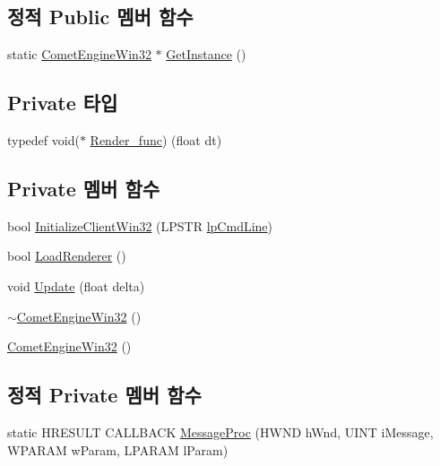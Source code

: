 \subsection*{정적 Public 멤버 함수}
\begin{DoxyCompactItemize}
\item 
static \hyperlink{class_comet_engine_1_1_comet_engine_win32}{Comet\+Engine\+Win32} $\ast$ \hyperlink{class_comet_engine_1_1_comet_engine_win32_af96d04b2fa84467a5342e290690e40fb}{Get\+Instance} ()
\end{DoxyCompactItemize}
\subsection*{Private 타입}
\begin{DoxyCompactItemize}
\item 
typedef void($\ast$ \hyperlink{class_comet_engine_1_1_comet_engine_win32_a97e4f6f1bfb397686ef973fe8bd42abf}{Render\+\_\+func}) (float dt)
\end{DoxyCompactItemize}
\subsection*{Private 멤버 함수}
\begin{DoxyCompactItemize}
\item 
bool \hyperlink{class_comet_engine_1_1_comet_engine_win32_a9f5ac1f01164dfdb7f752e6b4f77e80a}{Initialize\+Client\+Win32} (L\+P\+S\+TR \hyperlink{_d_l_l_comet_engine_win32_8cpp_af1ff5ad877f6069d41720b03c7769227}{lp\+Cmd\+Line})
\item 
bool \hyperlink{class_comet_engine_1_1_comet_engine_win32_a35f30fb8a7991557468d2fc3b25ff0b7}{Load\+Renderer} ()
\item 
void \hyperlink{class_comet_engine_1_1_comet_engine_win32_a5ceefb272acf4d0adb4964ec29e5996e}{Update} (float delta)
\item 
\hyperlink{class_comet_engine_1_1_comet_engine_win32_adc512ee25a2e71f894d254ae3b293ff0}{$\sim$\+Comet\+Engine\+Win32} ()
\item 
\hyperlink{class_comet_engine_1_1_comet_engine_win32_a62369ca325b16b42ad77a4f1523e4356}{Comet\+Engine\+Win32} ()
\end{DoxyCompactItemize}
\subsection*{정적 Private 멤버 함수}
\begin{DoxyCompactItemize}
\item 
static H\+R\+E\+S\+U\+LT C\+A\+L\+L\+B\+A\+CK \hyperlink{class_comet_engine_1_1_comet_engine_win32_a69f7f5121282027943c96964bb85ef85}{Message\+Proc} (H\+W\+ND h\+Wnd, U\+I\+NT i\+Message, W\+P\+A\+R\+AM w\+Param, L\+P\+A\+R\+AM l\+Param)
\end{DoxyCompactItemize}
